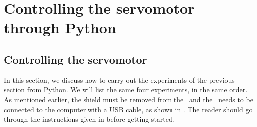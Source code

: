 \section{Controlling the servomotor through Python}
\subsection{Controlling the servomotor}
\label{sec:servo-py}
In this section, we discuss how to carry out the experiments of the
previous section from Python.  We will list the same four experiments,
in the same order. As mentioned earlier, the shield must be removed from 
the \arduino\ and the \arduino\ needs to be connected to the computer 
with a USB cable, as shown in . The reader should go through the instructions given in
 before getting started.


